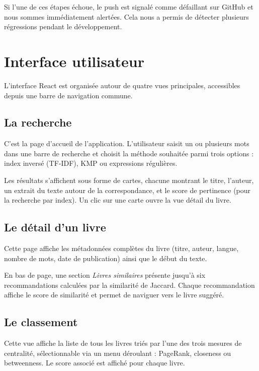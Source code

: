 \documentclass[12pt,a4paper]{article}
\begin{document}
Si l'une de ces étapes échoue, le push est signalé comme défaillant sur GitHub
et nous sommes immédiatement alertées. Cela nous a permis de détecter plusieurs
régressions pendant le développement.

\section{Interface utilisateur}

L'interface React est organisée autour de quatre vues principales, accessibles
depuis une barre de navigation commune.

\subsection{La recherche}

C'est la page d'accueil de l'application. L'utilisateur saisit un ou plusieurs
mots dans une barre de recherche et choisit la méthode souhaitée parmi trois
options : index inversé (TF-IDF), KMP ou expressions régulières.

Les résultats s'affichent sous forme de cartes, chacune montrant le titre,
l'auteur, un extrait du texte autour de la correspondance, et le score de
pertinence (pour la recherche par index). Un clic sur une carte ouvre la vue
détail du livre.

\subsection{Le détail d'un livre}

Cette page affiche les métadonnées complètes du livre (titre, auteur, langue,
nombre de mots, date de publication) ainsi que le début du texte.

En bas de page, une section \textit{Livres similaires} présente jusqu'à six
recommandations calculées par la similarité de Jaccard. Chaque recommandation
affiche le score de similarité et permet de naviguer vers le livre suggéré.

\subsection{Le classement}

Cette vue affiche la liste de tous les livres triés par l'une des trois mesures
de centralité, sélectionnable via un menu déroulant : PageRank, closeness ou
betweenness. Le score associé est affiché pour chaque livre.
\end{document}
